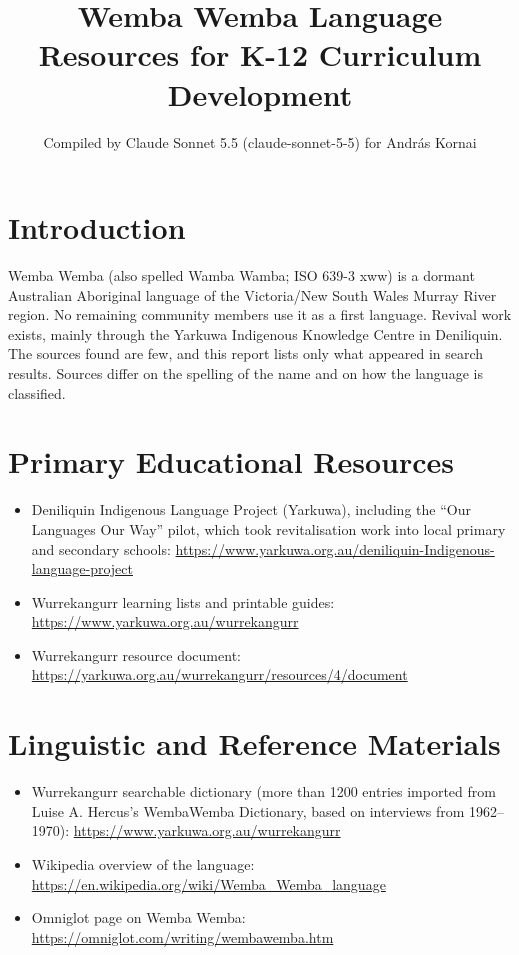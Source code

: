 \documentclass[12pt]{article}
\title{Wemba Wemba Language Resources for K-12 Curriculum Development}
\author{Compiled by Claude Sonnet 5.5 (claude-sonnet-5-5) for Andr\'as Kornai}
\date{}
\begin{document}
\maketitle

\section{Introduction}
Wemba Wemba (also spelled Wamba Wamba; ISO 639-3 xww) is a dormant Australian Aboriginal language of the Victoria/New South Wales Murray River region. No remaining community members use it as a first language. Revival work exists, mainly through the Yarkuwa Indigenous Knowledge Centre in Deniliquin. The sources found are few, and this report lists only what appeared in search results. Sources differ on the spelling of the name and on how the language is classified.

\section{Primary Educational Resources}
\begin{itemize}
\item Deniliquin Indigenous Language Project (Yarkuwa), including the ``Our Languages Our Way'' pilot, which took revitalisation work into local primary and secondary schools: \url{https://www.yarkuwa.org.au/deniliquin-Indigenous-language-project}
\item Wurrekangurr learning lists and printable guides: \url{https://www.yarkuwa.org.au/wurrekangurr}
\item Wurrekangurr resource document: \url{https://yarkuwa.org.au/wurrekangurr/resources/4/document}
\end{itemize}

\section{Linguistic and Reference Materials}
\begin{itemize}
\item Wurrekangurr searchable dictionary (more than 1200 entries imported from Luise A. Hercus's WembaWemba Dictionary, based on interviews from 1962--1970): \url{https://www.yarkuwa.org.au/wurrekangurr}
\item Wikipedia overview of the language: \url{https://en.wikipedia.org/wiki/Wemba_Wemba_language}
\item Omniglot page on Wemba Wemba: \url{https://omniglot.com/writing/wembawemba.htm}
\end{itemize}
\end{document}
